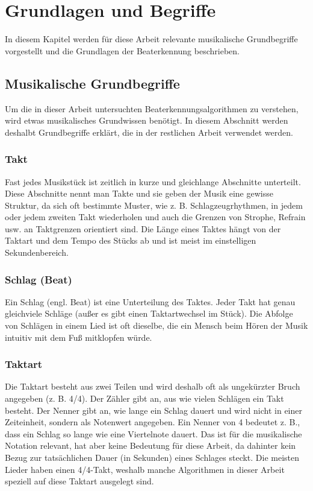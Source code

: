 \chapter{Grundlagen und Begriffe}
\label{grundlagen}
\acresetall

In diesem Kapitel werden für diese Arbeit relevante musikalische Grundbegriffe vorgestellt
	und die Grundlagen der Beaterkennung beschrieben.

\section{Musikalische Grundbegriffe}
{
	Um die in dieser Arbeit untersuchten Beaterkennungsalgorithmen zu verstehen,
		wird etwas musikalisches Grundwissen benötigt.
	In diesem Abschnitt werden deshalbt Grundbegriffe erklärt,
		die in der restlichen Arbeit verwendet werden.

	\subsection{Takt}
	{
		Fast jedes Musikstück ist zeitlich in kurze und gleichlange Abschnitte unterteilt.
		Diese Abschnitte nennt man Takte
			und sie geben der Musik eine gewisse Struktur,
			da sich oft bestimmte Muster, wie z. B. Schlagzeugrhythmen, in jedem oder jedem zweiten Takt wiederholen
			und auch die Grenzen von Strophe, Refrain usw. an Taktgrenzen orientiert sind.
		Die Länge eines Taktes hängt von der Taktart und dem Tempo des Stücks ab
			und ist meist im einstelligen Sekundenbereich.
	}

	\subsection{Schlag (Beat)}
	{
		Ein Schlag (engl. Beat) ist eine Unterteilung des Taktes.
		Jeder Takt hat genau gleichviele Schläge (au{\ss}er es gibt einen Taktartwechsel im Stück).
		Die Abfolge von Schlägen in einem Lied ist oft dieselbe,
			die ein Mensch beim Hören der Musik intuitiv mit dem Fu{\ss} mitklopfen würde.
	}

	\subsection{Taktart}
	{
		Die Taktart besteht aus zwei Teilen
			und wird deshalb oft als ungekürzter Bruch angegeben (z. B. 4/4).
		Der Zähler gibt an,
			aus wie vielen Schlägen ein Takt besteht.
		Der Nenner gibt an,
			wie lange ein Schlag dauert
			und wird nicht in einer Zeiteinheit,
			sondern als Notenwert angegeben.
		Ein Nenner von 4 bedeutet z. B.,
			dass ein Schlag so lange wie eine Viertelnote dauert.
		Das ist für die musikalische Notation relevant,
			hat aber keine Bedeutung für diese Arbeit,
			da dahinter kein Bezug zur tatsächlichen Dauer (in Sekunden) eines Schlages steckt.
		Die meisten Lieder haben einen 4/4-Takt,
			weshalb manche Algorithmen in dieser Arbeit speziell auf diese Taktart ausgelegt sind.
	}

}
